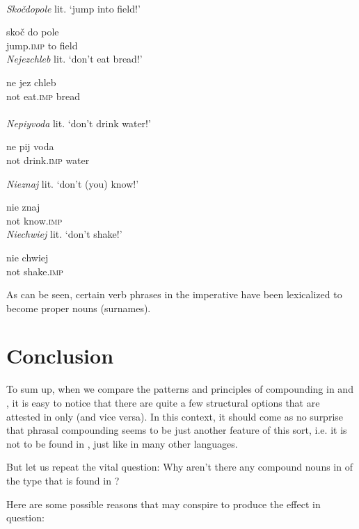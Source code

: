 \documentclass[output=paper]{LSP/langsci}
\begin{document}
\ea\label{ex:szymanek:24}  
\\
{\textit{Skočdopole}} {lit. ‘jump into field!’}


\gll      skoč     do   pole\\
 jump.\textsc{imp} to   field\\

{\textit{Nejezchleb}} {lit. ‘don’t eat bread!’}
 
\gll  ne  jez    chleb\\
 not eat.\textsc{imp} bread\\

 \\
 {\textit{Nepiyvoda}} {lit. ‘don’t drink water!’}

 \gll ne   pij     voda\\
 not drink.\textsc{imp} water\\


 {\textit{Nieznaj}} {lit. ‘don’t (you) know!’}

\gll       nie  znaj\\
 not   know.\textsc{imp}\\

 {\textit{Niechwiej}} {lit. ‘don’t shake!’}

 \gll nie  chwiej\\
 not  shake.\textsc{imp}\\
\z

As can be seen, certain verb phrases in the imperative have been lexicalized to become proper nouns (surnames). 

\section{Conclusion}

To sum up, when we compare the patterns and principles of compounding in  and , it is easy to notice that there are quite a few structural options that are attested in  only (and vice versa). In this context, it should come as no surprise that phrasal compounding seems to be just another feature of this sort, i.e. it is not to be found in , just like in many other languages.

But let us repeat the vital question: Why aren’t there any compound nouns in  of the type that is found in ?

Here are some possible reasons that may conspire to produce the effect in question:
\end{document}
